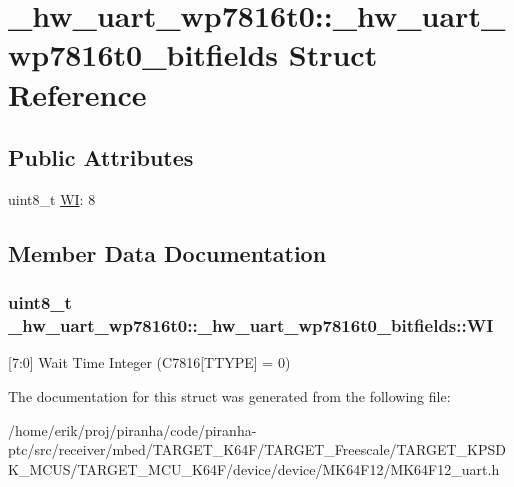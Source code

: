 \hypertarget{struct__hw__uart__wp7816t0_1_1__hw__uart__wp7816t0__bitfields}{}\section{\+\_\+hw\+\_\+uart\+\_\+wp7816t0\+:\+:\+\_\+hw\+\_\+uart\+\_\+wp7816t0\+\_\+bitfields Struct Reference}
\label{struct__hw__uart__wp7816t0_1_1__hw__uart__wp7816t0__bitfields}
\subsection*{Public Attributes}
\begin{DoxyCompactItemize}
\item 
uint8\+\_\+t \hyperlink{struct__hw__uart__wp7816t0_1_1__hw__uart__wp7816t0__bitfields_a01deddc0142c858e4055b088ae35b2c4}{WI}\+: 8
\end{DoxyCompactItemize}


\subsection{Member Data Documentation}
\subsubsection[{\texorpdfstring{WI}{WI}}]{\setlength{\rightskip}{0pt plus 5cm}uint8\+\_\+t \+\_\+hw\+\_\+uart\+\_\+wp7816t0\+::\+\_\+hw\+\_\+uart\+\_\+wp7816t0\+\_\+bitfields\+::\+WI}\hypertarget{struct__hw__uart__wp7816t0_1_1__hw__uart__wp7816t0__bitfields_a01deddc0142c858e4055b088ae35b2c4}{}\label{struct__hw__uart__wp7816t0_1_1__hw__uart__wp7816t0__bitfields_a01deddc0142c858e4055b088ae35b2c4}
\mbox{[}7\+:0\mbox{]} Wait Time Integer (C7816\mbox{[}T\+T\+Y\+PE\mbox{]} = 0) 

The documentation for this struct was generated from the following file\+:\begin{DoxyCompactItemize}
\item 
/home/erik/proj/piranha/code/piranha-\/ptc/src/receiver/mbed/\+T\+A\+R\+G\+E\+T\+\_\+\+K64\+F/\+T\+A\+R\+G\+E\+T\+\_\+\+Freescale/\+T\+A\+R\+G\+E\+T\+\_\+\+K\+P\+S\+D\+K\+\_\+\+M\+C\+U\+S/\+T\+A\+R\+G\+E\+T\+\_\+\+M\+C\+U\+\_\+\+K64\+F/device/device/\+M\+K64\+F12/M\+K64\+F12\+\_\+uart.\+h\end{DoxyCompactItemize}
